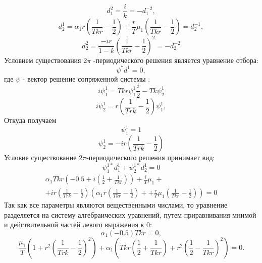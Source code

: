 \documentclass[12pt]{article}
\begin{document}
\begin{equation*}
    d^2_1=\frac{i}{k}=- d^{-2}_{1},
\end{equation*}
\begin{equation*}
    d^1_2=\alpha_1  r \left ( \frac{1}{T k r}-\frac{1}{2} \right)+\frac{r}{T} \mu_1 \left ( \frac{1}{T k r}-\frac{1}{2} \right)=d^{-1}_2,
\end{equation*}
\begin{equation*}
    d^2_2=\frac{-i r}{1-k} \left ( \frac{1}{T k r}-\frac{1}{2} \right)^2 =-d^{-2}_2
\end{equation*}
Условием существования 2$\pi$ -периодического решения является уравнение отбора:
\begin{equation*}
    \psi^* d^1 =0,
\end{equation*}
где $\psi$ - вектор решение сопряженной системы :
 \begin{equation*}
     i \psi_1^1=T k r \psi_1^1 \frac{i}{2}- T k \psi_2^1
 \end{equation*}
 \begin{equation*}
     i \psi_2^1=r \left(  \frac{1}{T r k} - \frac{1}{2}\right) \psi_1^1 ,
 \end{equation*}
 Откуда получаем
 \begin{equation*}
     \psi_1^1 =1
 \end{equation*}
 \begin{equation*}
     \psi_2^1=-i r \left(  \frac{1}{T r k} - \frac{1}{2}\right)
 \end{equation*}
Условие существование 2$\pi$-периодического решения принимает вид:
\begin{equation}
    \psi_1^{1*} d^1_1+\psi_2^{1*} d^1_2 =0
\end{equation}
\begin{multline*}
   \alpha_1 T k r \left ( -0.5+i(\frac{1}{2}+\frac{1}{T k r}) \right)+\frac{i}{T} \mu_1+\\+i r \left(  \frac{1}{T r k} - \frac{1}{2}\right) \left(\alpha_1  r \left ( \frac{1}{T k r}-\frac{1}{2} \right)++\frac{r}{T} \mu_1 \left ( \frac{1}{T k r}-\frac{1}{2} \right)\right) =0
\end{multline*}
Так как все параметры являются вещественными числами, то уравнение разделяется на систему алгебраических уравнений, путем приравнивания мнимой и действительной частей левого выражения к 0:
\begin{equation*}
    \alpha_1 (-0.5) T k r=0,
\end{equation*}
\begin{equation*}
    \frac{\mu_1}{T}\left( 1+r^2 \left(\frac{1}{T r k}-\frac{1}{2} \right)^2\right)+\alpha_1 \left(T k r \left(\frac{1}{2}+\frac{1}{ T k r}\right)+r^2 \left(\frac{1}{2}-\frac{1}{T k r}\right)^2 \right)=0.
\end{equation*}
\end{document}
